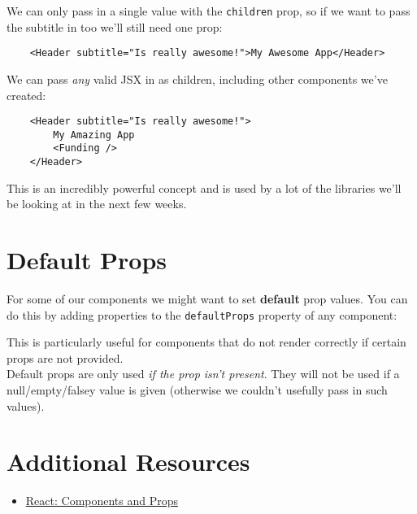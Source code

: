 We can only pass in a single value with the \texttt{children} prop, so if we want to pass the subtitle in too we'll still need one prop:

\begin{verbatim}
    <Header subtitle="Is really awesome!">My Awesome App</Header>
\end{verbatim}

We can pass \textit{any} valid JSX in as children, including other components we've created:

\begin{verbatim}
    <Header subtitle="Is really awesome!">
        My Amazing App
        <Funding />
    </Header>
\end{verbatim}

This is an incredibly powerful concept and is used by a lot of the libraries we'll be looking at in the next few weeks.


\pagebreak


\section{Default Props}


For some of our components we might want to set \textbf{default} prop values. You can do this by adding properties to the \texttt{defaultProps} property of any component:


This is particularly useful for components that do not render correctly if certain props are not provided.
\\

Default props are only used \textit{if the prop isn't present}. They will not be used if a null/empty/falsey value is given (otherwise we couldn't usefully pass in such values).


\section{Additional Resources}

\begin{itemize}[leftmargin=*]
    \item \href{https://reactjs.org/docs/components-and-props.html}{React: Components and Props}
\end{itemize}
